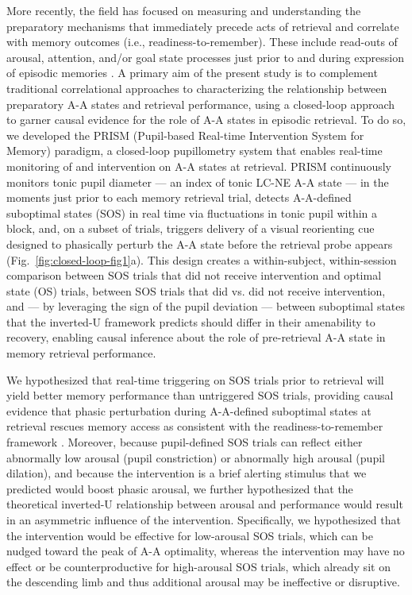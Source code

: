 More recently, the field has focused on measuring and understanding the preparatory mechanisms that immediately precede acts of retrieval and correlate with memory outcomes (i.e., readiness-to-remember). These include read-outs of arousal, attention, and/or goal state processes just prior to and during expression of episodic memories \parencite{robison2022pupillary,miller2020variation,miller2019individual,cohen2015peri,madore2022readiness,madore2020memory,schwartz2025attending,xue2025strong}. A primary aim of the present study is to complement traditional correlational approaches to characterizing the relationship between preparatory A-A states and retrieval performance, using a closed-loop approach to garner causal evidence for the role of A-A states in episodic retrieval. To do so, we developed the PRISM (Pupil-based Real-time Intervention System for Memory) paradigm, a closed-loop pupillometry system that enables real-time monitoring of and intervention on A-A states at retrieval. PRISM continuously monitors tonic pupil diameter — an index of tonic LC-NE A-A state — in the moments just prior to each memory retrieval trial, detects A-A-defined suboptimal states (SOS) in real time via fluctuations in tonic pupil within a block, and, on a subset of trials, triggers delivery of a visual reorienting cue designed to phasically perturb the A-A state before the retrieval probe appears (Fig.~\ref{fig:closed-loop-fig1}a). This design creates a within-subject, within-session comparison between SOS trials that did not receive intervention and optimal state (OS) trials, between SOS trials that did vs. did not receive intervention, and — by leveraging the sign of the pupil deviation — between suboptimal states that the inverted-U framework predicts should differ in their amenability to recovery, enabling causal inference about the role of pre-retrieval A-A state in memory retrieval performance. 

We hypothesized that real-time triggering on SOS trials prior to retrieval will yield better memory performance than untriggered SOS trials, providing causal evidence that phasic perturbation during A-A-defined suboptimal states at retrieval rescues memory access as consistent with the readiness-to-remember framework \parencite{madore2022readiness,madore2020memory,schwartz2025attending}. Moreover, because pupil-defined SOS trials can reflect either abnormally low arousal (pupil constriction) or abnormally high arousal (pupil dilation), and because the intervention is a brief alerting stimulus that we predicted would boost phasic arousal, we further hypothesized that the theoretical inverted-U relationship between arousal and performance \parencite{yerkes1908relation} would result in an asymmetric influence of the intervention. Specifically, we hypothesized that the intervention would be effective for low-arousal SOS trials, which can be nudged toward the peak of A-A optimality, whereas the intervention may have no effect or be counterproductive for high-arousal SOS trials, which already sit on the descending limb and thus additional arousal may be ineffective or disruptive.

